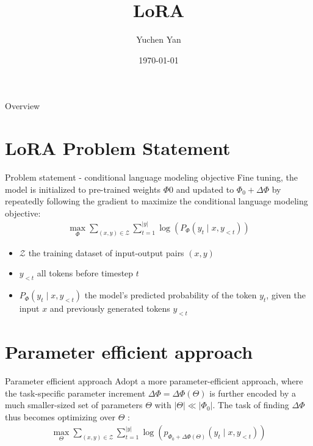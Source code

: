 \documentclass[aspectratio=169,xcolor=dvipsnames]{beamer}
\title{LoRA}
\author{Yuchen Yan}
\institute{Australian National University}
\date{\today}
\begin{document}
\begin{frame}
    \titlepage
\end{frame}

\begin{frame}{Overview}
    \tableofcontents
\end{frame}

\section{LoRA Problem Statement}

\begin{frame}{Problem statement - conditional language modeling objective}
    Fine tuning, the model is initialized to pre-trained weights $\Phi{0}$ and updated to $\Phi_{0} + \Delta \Phi$ by repeatedly following the gradient to maximize the conditional language modeling objective:
    \begin{align*}
        \max _{\Phi} \sum_{(x, y) \in \mathcal{Z}} \sum_{t=1}^{|y|} \log \left(P_{\Phi}\left(y_t \mid x, y_{<t}\right)\right)
    \end{align*}

    \begin{itemize}
        \item $\mathcal{Z}$ the training dataset of input-output pairs $(x,y)$
        \item $y_{<t}$ all tokens before timestep $t$
        \item $P_{\Phi}\left(y_t \mid x, y_{<t}\right)$ the model's predicted probability of the token $y_t$, given the input $x$ and previously generated tokens $y_{<t}$
    \end{itemize}
\end{frame}

\section{Parameter efficient approach}

\begin{frame}{Parameter efficient approach}
    Adopt a more parameter-efficient approach, where the task-specific parameter increment $\Delta \Phi=\Delta \Phi(\Theta)$ is further encoded by a much smaller-sized set of parameters $\Theta$ with $|\Theta| \ll\left|\Phi_0\right|$. The task of finding $\Delta \Phi$ thus becomes optimizing over $\Theta$ :
    \bigskip
    \begin{align*}
        \max _{\Theta} \sum_{(x, y) \in \mathcal{Z}} \sum_{t=1}^{|y|} \log \left(p_{\Phi_0+\Delta \Phi(\Theta)}\left(y_t \mid x, y_{<t}\right)\right)
    \end{align*}
\end{frame}
\end{document}
